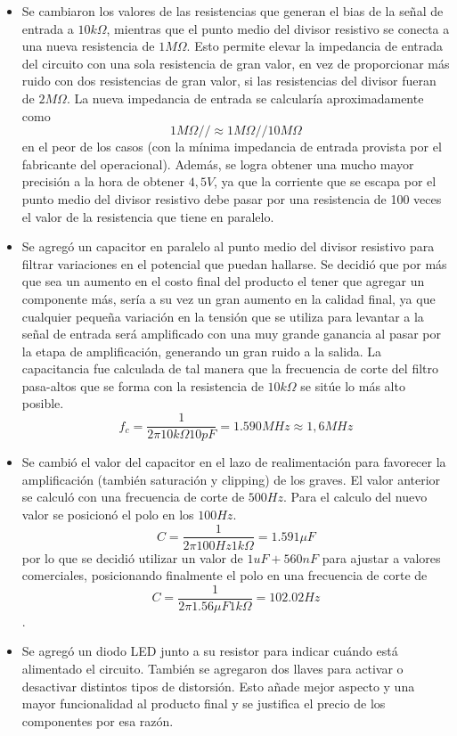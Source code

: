 \begin{itemize}
\item Se cambiaron los valores de las resistencias que generan el bias de la señal de entrada a $10k\Omega$, mientras que el punto medio del divisor resistivo se conecta a una nueva resistencia de $1M\Omega$. Esto permite elevar la impedancia de entrada del circuito con una sola resistencia de gran valor, en vez de proporcionar más ruido con dos resistencias de gran valor, si las resistencias del divisor fueran de $2M\Omega$. La nueva impedancia de entrada se calcularía aproximadamente como $$ 1M\Omega//\approx1M\Omega//10M\Omega $$ en el peor de los casos (con la mínima impedancia de entrada provista por el fabricante del operacional).
Además, se logra obtener una mucho mayor precisión a la hora de obtener $4,5V$, ya que la corriente que se escapa por el punto medio del divisor resistivo debe pasar por una resistencia de 100 veces el valor de la resistencia que tiene en paralelo.
\item Se agregó un capacitor en paralelo al punto medio del divisor resistivo para filtrar variaciones en el potencial que puedan hallarse. Se decidió que por más que sea un aumento en el costo final del producto el tener que agregar un componente más, sería a su vez un gran aumento en la calidad final, ya que cualquier pequeña variación en la tensión que se utiliza para levantar a la señal de entrada será amplificado con una muy grande ganancia al pasar por la etapa de amplificación, generando un gran ruido a la salida. La capacitancia fue calculada de tal manera que la frecuencia de corte del filtro pasa-altos que se forma con la resistencia de $10k\Omega$ se sitúe lo más alto posible. $$ f_c = \frac{1}{2\pi 10k\Omega 10pF} = 1.590MHz \approx 1,6MHz$$
\item Se cambió el valor del capacitor en el lazo de realimentación para favorecer la amplificación (también saturación y clipping) de los graves. El valor anterior se calculó con una frecuencia de corte de $500Hz$. Para el calculo del nuevo valor se posicionó el polo en los $100Hz$. $$C = \frac{1}{2\pi 100Hz 1k\Omega} = 1.591\mu F$$ por lo que se decidió utilizar un valor de $1uF + 560nF$ para ajustar a valores comerciales, posicionando finalmente el polo en una frecuencia de corte de  $$C = \frac{1}{2\pi 1.56\mu F 1k\Omega} = 102.02Hz$$.
\item Se agregó un diodo LED junto a su resistor para indicar cuándo está alimentado el circuito. También se agregaron dos llaves para activar o desactivar distintos tipos de distorsión. Esto añade mejor aspecto y una mayor funcionalidad al producto final y se justifica el precio de los componentes por esa razón.

\end{itemize}
